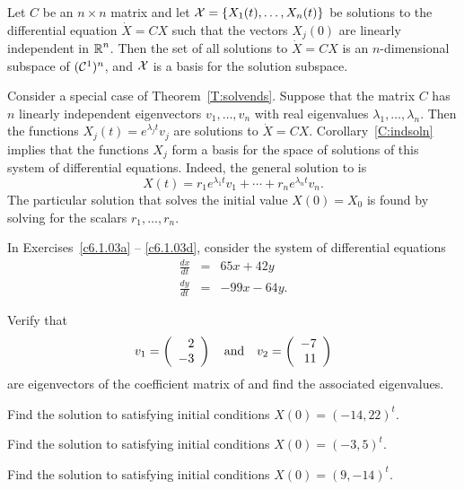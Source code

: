 \documentclass{ximera}
\begin{document}
\begin{cor}  \label{C:indsoln}
Let $C$ be an $n\times n$ matrix and let ${\cal X}=\{X_1(t),\ldots,X_n(t)\}$
be solutions to the differential equation $\dot{X}=CX$ such that the vectors
$X_j(0)$ are linearly independent in $\mbox{$\Bbb{R}$}^n$.  Then the set of all solutions
to $\dot{X}=CX$ is an $n$-dimensional subspace of $({\cal C}^1)^n$, and
${\cal X}$ is a basis for the solution subspace.
\end{cor}

Consider a special case of Theorem~\ref{T:solvends}.  Suppose that the
matrix $C$ has $n$ linearly independent eigenvectors $v_1,\ldots,v_n$ with
real eigenvalues $\lambda_1,\ldots,\lambda_n$.  Then the functions
$X_j(t)=e^{\lambda_j t}v_j$ are solutions to $\dot{X}=CX$.
Corollary~\ref{C:indsoln} implies that the functions $X_j$ form a basis for
the space of solutions of this system of differential equations.  Indeed,
the general solution to  is
\begin{equation}  \label{e:gensoln}
X(t) = r_1e^{\lambda_1 t}v_1 + \cdots + r_ne^{\lambda_n t}v_n.
\end{equation}
The particular solution that solves the initial value $X(0)=X_0$ is found by
solving  for the scalars $r_1,\ldots,r_n$.





\EXER

\TEXER

\noindent In Exercises~\ref{c6.1.03a} -- \ref{c6.1.03d}, consider the system of
differential equations
\begin{equation} \label{Ex.1.03}
\begin{array}{rcr}
\frac{dx}{dt}  & = & 65x+42y \\
\frac{dy}{dt}  & = & -99x-64y.
\end{array}
\end{equation}
\begin{exercise} \label{c6.1.03a}
Verify that
\[
v_1 = \left(\begin{array}{r} 2 \\ -3\end{array}\right) \quad\mbox{and}\quad v_2 = \left(\begin{array}{r} -7 \\ 11\end{array}\right)
\]
are eigenvectors of the coefficient matrix of  and find
the associated eigenvalues.
\end{exercise}
\begin{exercise} \label{c6.1.03b}
Find the solution to  satisfying initial conditions $X(0) =
(-14,22)^t$.
\end{exercise}
\begin{exercise} \label{c6.1.03c}
Find the solution to  satisfying initial conditions $X(0) =
(-3,5)^t$.
\end{exercise}
\begin{exercise} \label{c6.1.03d}
Find the solution to  satisfying initial conditions $X(0) =
(9,-14)^t$.
\end{exercise}
\end{document}
